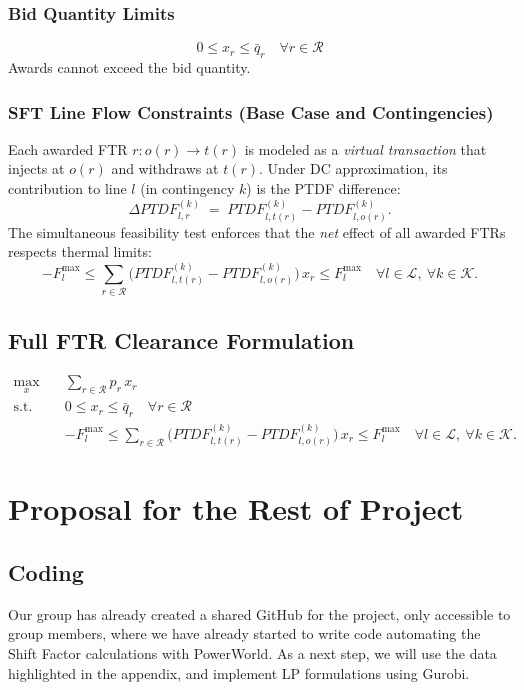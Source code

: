\documentclass[11pt]{article}
\begin{document}
\subsubsection{Bid Quantity Limits}
\begin{equation}
0 \le x_r \le \bar q_r \quad \forall r\in\mathcal{R}
\tag{2}
\end{equation}
Awards cannot exceed the bid quantity.

\subsubsection{SFT Line Flow Constraints (Base Case and Contingencies)}
Each awarded FTR $r: o(r)\to t(r)$ is modeled as a \emph{virtual transaction} that injects at $o(r)$ and
withdraws at $t(r)$. Under DC approximation, its contribution to line $l$ (in contingency $k$) is the PTDF
difference:
\[
\Delta PTDF^{(k)}_{l,r} \;=\; PTDF^{(k)}_{l,t(r)} - PTDF^{(k)}_{l,o(r)}.
\]
The simultaneous feasibility test enforces that the \emph{net} effect of all awarded FTRs respects thermal limits:
\begin{equation}
- F_l^{\max}
\le
\sum_{r\in\mathcal{R}} \Big( PTDF^{(k)}_{l,t(r)} - PTDF^{(k)}_{l,o(r)} \Big)\,x_r
\le
F_l^{\max}
\quad \forall l\in\mathcal{L},\ \forall k\in\mathcal{K}.
\tag{3}
\end{equation}

\subsection{Full FTR Clearance Formulation}
\begin{align}
\max_{x}\quad & \sum_{r\in\mathcal{R}} p_r\,x_r
\tag{4}\\[4pt]
\text{s.t.}\quad
& 0 \le x_r \le \bar q_r \quad \forall r\in\mathcal{R}
\tag{5}\\[4pt]
& - F_l^{\max}
\le
\sum_{r\in\mathcal{R}} \Big( PTDF^{(k)}_{l,t(r)} - PTDF^{(k)}_{l,o(r)} \Big)\,x_r
\le
F_l^{\max}
\quad \forall l\in\mathcal{L},\ \forall k\in\mathcal{K}.
\tag{6}
\end{align}


\newpage

\section{Proposal for the Rest of Project}

\subsection{Coding}
Our group has already created a shared GitHub for the project, only accessible to group members, where we have already started to write code automating the Shift Factor calculations with PowerWorld. As a next step, we will use the data highlighted in the appendix, and implement LP formulations using Gurobi.
\end{document}

